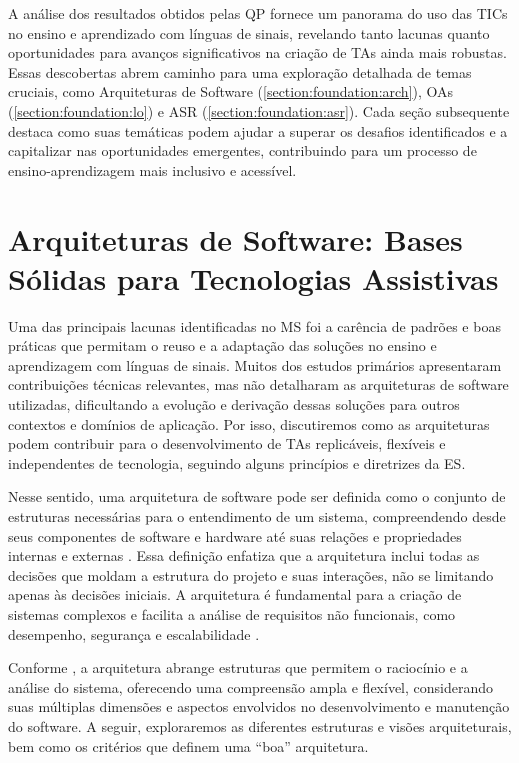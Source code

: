 A análise dos resultados obtidos pelas QP fornece um panorama do uso das TICs no ensino e aprendizado com línguas de sinais, revelando tanto lacunas quanto oportunidades para avanços significativos na criação de TAs ainda mais robustas. Essas descobertas abrem caminho para uma exploração detalhada de temas cruciais, como Arquiteturas de Software (\autoref{section:foundation:arch}), OAs (\autoref{section:foundation:lo}) e ASR (\autoref{section:foundation:asr}). Cada seção subsequente destaca como suas temáticas podem ajudar a superar os desafios identificados e a capitalizar nas oportunidades emergentes, contribuindo para um processo de ensino-aprendizagem mais inclusivo e acessível.

\section{Arquiteturas de Software: Bases Sólidas para Tecnologias Assistivas}
\label{section:foundation:arch}

Uma das principais lacunas identificadas no MS foi a carência de padrões e boas práticas que permitam o reuso e a adaptação das soluções no ensino e aprendizagem com línguas de sinais. Muitos dos estudos primários apresentaram contribuições técnicas relevantes, mas não detalharam as arquiteturas de software utilizadas, dificultando a evolução e derivação dessas soluções para outros contextos e domínios de aplicação. Por isso, discutiremos como as arquiteturas podem contribuir para o desenvolvimento de TAs replicáveis, flexíveis e independentes de tecnologia, seguindo alguns princípios e diretrizes da ES.

Nesse sentido, uma arquitetura de software pode ser definida como o conjunto de estruturas necessárias para o entendimento de um sistema, compreendendo desde seus componentes de software e hardware até suas relações e propriedades internas e externas \cite{Bass2021}. Essa definição enfatiza que a arquitetura inclui todas as decisões que moldam a estrutura do projeto e suas interações, não se limitando apenas às decisões iniciais. A arquitetura é fundamental para a criação de sistemas complexos e facilita a análise de requisitos não funcionais, como desempenho, segurança e escalabilidade \cite{Pressman2016, Sommerville2015}.

Conforme , a arquitetura abrange estruturas que permitem o raciocínio e a análise do sistema, oferecendo uma compreensão ampla e flexível, considerando suas múltiplas dimensões e aspectos envolvidos no desenvolvimento e manutenção do software. A seguir, exploraremos as diferentes estruturas e visões arquiteturais, bem como os critérios que definem uma ``boa'' arquitetura.

